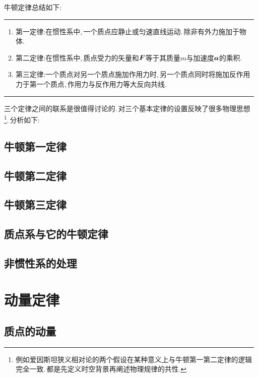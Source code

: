 牛顿定律总结如下:
\vspace{0.5cm}

\hrule
\begin{enumerate}
	\item 第一定律:\quad 在惯性系中,\,一个质点应静止或匀速直线运动.\,除非有外力施加于物体.
	\item 第二定律:\quad 在惯性系中,\,质点受力的矢量和$\boldsymbol{F}$等于其质量$m$与加速度$\boldsymbol{a}$的乘积.
	\item 第三定律:\quad 一个质点对另一个质点施加作用力时,\,另一个质点同时将施加反作用力于第一个质点,\,作用力与反作用力等大反向共线.
\end{enumerate}
\hrule
\vspace{0.5cm}

三个定律之间的联系是很值得讨论的.\,对三个基本定律的设置反映了很多物理思想\footnote{例如爱因斯坦狭义相对论的两个假设在某种意义上与牛顿第一第二定律的逻辑完全一致.\,都是先定义时空背景再阐述物理规律的共性.}.\,分析如下:

\subsection{牛顿第一定律}

\subsection{牛顿第二定律}

\subsection{牛顿第三定律}

\subsection{质点系与它的牛顿定律}

\subsection{非惯性系的处理}


\section{动量定律}

\subsection{质点的动量}

